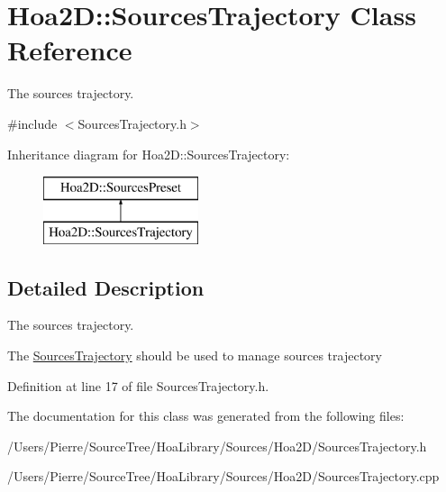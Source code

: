 \hypertarget{class_hoa2_d_1_1_sources_trajectory}{\section{Hoa2\-D\-:\-:Sources\-Trajectory Class Reference}
\label{class_hoa2_d_1_1_sources_trajectory}
}


The sources trajectory.  




{\ttfamily \#include $<$Sources\-Trajectory.\-h$>$}

Inheritance diagram for Hoa2\-D\-:\-:Sources\-Trajectory\-:\begin{figure}[H]
\begin{center}
\leavevmode
\includegraphics[height=2.000000cm]{class_hoa2_d_1_1_sources_trajectory}
\end{center}
\end{figure}


\subsection{Detailed Description}
The sources trajectory. 

The \hyperlink{class_hoa2_d_1_1_sources_trajectory}{Sources\-Trajectory} should be used to manage sources trajectory 

Definition at line 17 of file Sources\-Trajectory.\-h.



The documentation for this class was generated from the following files\-:\begin{DoxyCompactItemize}
\item 
/\-Users/\-Pierre/\-Source\-Tree/\-Hoa\-Library/\-Sources/\-Hoa2\-D/Sources\-Trajectory.\-h\item 
/\-Users/\-Pierre/\-Source\-Tree/\-Hoa\-Library/\-Sources/\-Hoa2\-D/Sources\-Trajectory.\-cpp\end{DoxyCompactItemize}
